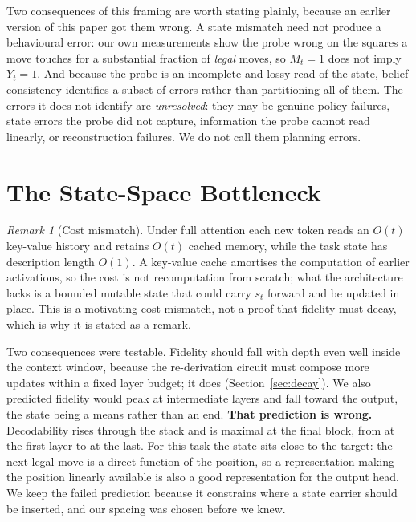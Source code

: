 \documentclass[manuscript, screen, review]{jair}
\theoremstyle{remark}
\newtheorem{jairremark}{Remark}
\newenvironment{remark}{\begin{jairremark}}{\end{jairremark}}
\begin{document}
Two consequences of this framing are worth stating plainly, because an earlier
version of this paper got them wrong. A state mismatch need not produce a
behavioural error: our own measurements show the probe wrong on the squares a
move touches for a substantial fraction of \emph{legal} moves, so
$M_t{=}1$ does not imply $Y_t{=}1$. And because the probe is an incomplete and
lossy read of the state, belief consistency identifies a subset of errors rather
than partitioning all of them. The errors it does not identify are
\emph{unresolved}: they may be genuine policy failures, state errors the probe
did not capture, information the probe cannot read linearly, or reconstruction
failures. We do not call them planning errors.

\section{The State-Space Bottleneck}
\label{sec:bottleneck}

\begin{remark}[Cost mismatch]
Under full attention each new token reads an $O(t)$ key-value history and
retains $O(t)$ cached memory, while the task state has description length
$O(1)$. A key-value cache amortises the computation of earlier activations, so
the cost is not recomputation from scratch; what the architecture lacks is a
bounded mutable state that could carry $s_t$ forward and be updated in place.
This is a motivating cost mismatch, not a proof that fidelity must decay, which
is why it is stated as a remark.
\end{remark}

Two consequences were testable. Fidelity should fall with depth even well inside
the context window, because the re-derivation circuit must compose more updates
within a fixed layer budget; it does (Section~\ref{sec:decay}). We also predicted
fidelity would peak at intermediate layers and fall toward the output, the state
being a means rather than an end. \textbf{That prediction is wrong.} Decodability
rises through the stack and is maximal at the final block, from
 at the first layer to  at the last.
For this task the state sits close to the target: the next legal move is a direct
function of the position, so a representation making the position linearly
available is also a good representation for the output head. We keep the failed
prediction because it constrains where a state carrier should be inserted, and
our spacing was chosen before we knew.
\end{document}
